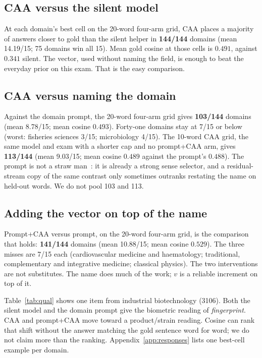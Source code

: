 \documentclass{article} %
\begin{document}
\subsection{CAA versus the silent model}

At each domain's best cell on the 20-word four-arm grid, CAA places a majority of answers closer to gold than the silent helper in \textbf{144/144} domains (mean 14.19/15; 75 domains win all 15).
Mean gold cosine at those cells is $0.491$, against $0.341$ silent.
The vector, used without naming the field, is enough to beat the everyday prior on this exam.
That is the easy comparison.

\subsection{CAA versus naming the domain}

Against the domain prompt, the 20-word four-arm grid gives \textbf{103/144} domains (mean 8.78/15; mean cosine $0.493$).
Forty-one domains stay at 7/15 or below (worst: fisheries sciences 3/15; microbiology 4/15).
The 10-word CAA grid, the same model and exam with a shorter cap and no prompt+CAA arm, gives \textbf{113/144} (mean 9.03/15; mean cosine $0.489$ against the prompt's $0.488$).
The prompt is not a straw man~\citep{zheng2024personas,wu2025axbench}: it is already a strong sense selector, and a residual-stream copy of the same contrast only sometimes outranks restating the name on held-out words.
We do not pool 103 and 113.

\subsection{Adding the vector on top of the name}

Prompt+CAA versus prompt, on the 20-word four-arm grid, is the comparison that holds: \textbf{141/144} domains (mean 10.88/15; mean cosine $0.529$).
The three misses are 7/15 each (cardiovascular medicine and haematology; traditional, complementary and integrative medicine; classical physics).
The two interventions are not substitutes.
The name does much of the work; $v$ is a reliable increment on top of it.

Table~\ref{tab:qual} shows one item from industrial biotechnology (3106).
Both the silent model and the domain prompt give the biometric reading of \emph{fingerprint}.
CAA and prompt+CAA move toward a product/strain reading.
Cosine can rank that shift without the answer matching the gold sentence word for word; we do not claim more than the ranking.
Appendix~\ref{app:responses} lists one best-cell example per domain.
\end{document}
